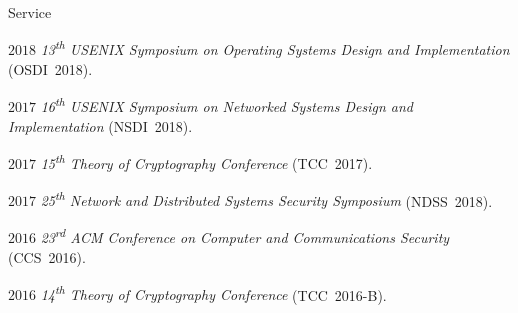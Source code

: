 \documentclass[11pt]{article}
\begin{document}
\begin{cv}{\vspace{-5em}}
\begin{cvlist}{Service}
    \item[\small $2018$] \emph{13\textsuperscript{th} USENIX Symposium on Operating Systems Design and Implementation} (OSDI~2018).
    \item[\small $2017$] \emph{16\textsuperscript{th} USENIX Symposium on Networked Systems Design and Implementation} (NSDI~2018).
    \item[\small $2017$] \emph{15\textsuperscript{th} Theory of Cryptography Conference} (TCC~2017).
    \item[\small $2017$] \emph{25\textsuperscript{th} Network and Distributed Systems Security Symposium} (NDSS~2018).
    \item[\small $2016$] \emph{23\textsuperscript{rd} ACM Conference on Computer and Communications Security} (CCS~2016).
    \item[\small $2016$] \emph{14\textsuperscript{th} Theory of Cryptography Conference} (TCC~2016-B).
  \end{cvlist}
\end{cv}

\newsavebox\mytempbib
\savebox\mytempbib{\parbox{\textwidth}{}}
\end{document}
